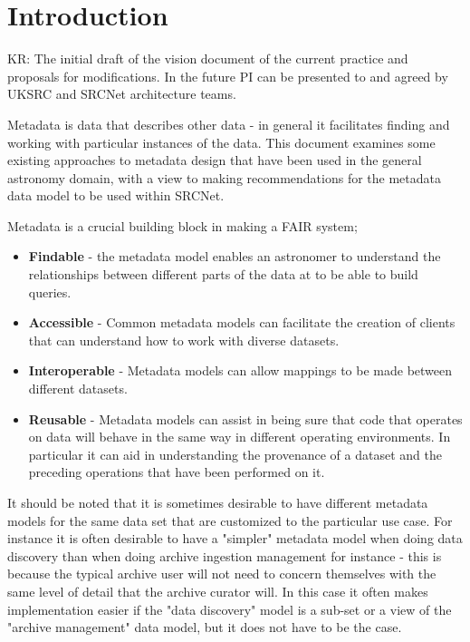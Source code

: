 \section{Introduction}\label{sec:intro}

KR: The initial draft of the vision document of the current practice and proposals for modifications. In the future PI can be presented to and agreed by UKSRC and SRCNet architecture teams.


Metadata is data that describes other data - in general it facilitates finding and working with particular instances of the data. This document examines some existing approaches to metadata design that have been used in the general astronomy domain, with a view to making recommendations for the metadata data model to be used within SRCNet.

Metadata is a crucial building block in making a FAIR system;
\begin{itemize}
    \item \textbf{Findable} - the metadata model enables an astronomer to understand the relationships between different parts of the data at to be able to build queries.
    \item \textbf{Accessible} - Common metadata models can facilitate the creation of clients that can understand how to work with diverse datasets.
    \item \textbf{Interoperable} - Metadata models can allow mappings to be made between different datasets.
    \item \textbf{Reusable} - Metadata models can assist in being sure that code that operates on data will behave in the same way in different operating environments. In particular it can aid in understanding the provenance of a dataset and the preceding operations that have been performed on it. 
    
\end{itemize}

It should be noted that it is sometimes desirable to have different metadata models for the same data set that are customized to the particular use case. For instance it is often desirable to have a "simpler" metadata model when doing data discovery than when doing archive ingestion management for instance - this is because the typical archive user will not need to concern themselves with the same level of detail that the archive curator will. In this case it often makes implementation easier if the "data discovery" model is a sub-set or a view of the "archive management" data model, but it does not have to be the case.

